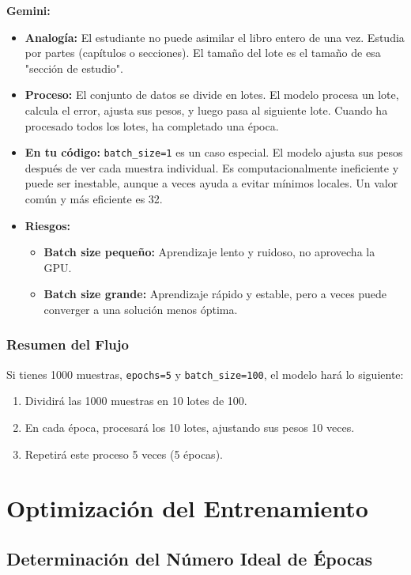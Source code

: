 \documentclass[12pt, a4paper]{article}
\newenvironment{gemini}{\par\noindent\textbf{Gemini:}\par\ignorespaces}{\par}
\begin{document}
\begin{gemini}
\begin{itemize}
    \item \textbf{Analogía:} El estudiante no puede asimilar el libro entero de una vez. Estudia por partes (capítulos o secciones). El tamaño del lote es el tamaño de esa "sección de estudio".
    \item \textbf{Proceso:} El conjunto de datos se divide en lotes. El modelo procesa un lote, calcula el error, ajusta sus pesos, y luego pasa al siguiente lote. Cuando ha procesado todos los lotes, ha completado una época.
    \item \textbf{En tu código:} \texttt{batch\_size=1} es un caso especial. El modelo ajusta sus pesos después de ver cada muestra individual. Es computacionalmente ineficiente y puede ser inestable, aunque a veces ayuda a evitar mínimos locales. Un valor común y más eficiente es 32.
    \item \textbf{Riesgos:}
        \begin{itemize}
            \item \textbf{Batch size pequeño:} Aprendizaje lento y ruidoso, no aprovecha la GPU.
            \item \textbf{Batch size grande:} Aprendizaje rápido y estable, pero a veces puede converger a una solución menos óptima.
        \end{itemize}
\end{itemize}

\subsubsection{Resumen del Flujo}
Si tienes 1000 muestras, \texttt{epochs=5} y \texttt{batch\_size=100}, el modelo hará lo siguiente:
\begin{enumerate}
    \item Dividirá las 1000 muestras en 10 lotes de 100.
    \item En cada época, procesará los 10 lotes, ajustando sus pesos 10 veces.
    \item Repetirá este proceso 5 veces (5 épocas).
\end{enumerate}
\end{gemini}

\section{Optimización del Entrenamiento}

\subsection{Determinación del Número Ideal de Épocas}
\end{document}
